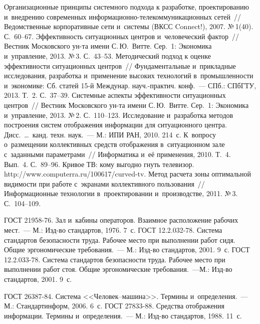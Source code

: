 \begin{multicols}{2}
{{\begin{thebibliography}{99}
 Организационные принципы сис\-тем\-но\-го подхода к разработке,
проектированию и~внедрению современных
ин\-фор\-ма\-ци\-он\-но-те\-ле\-ком\-му\-ни\-ка\-ци\-он\-ных сетей~// Ведомственные
корпоративные сети и~системы (ВКСС Connect!), 2007. №\,1(40). С.~60--67.
 Эффективность ситуационных центров
и~человеческий фактор~// Вестник Московского ун-та имени С.\,Ю.~Витте. Сер.~1:
Экономика и~управление, 2013. №\,3. С.~43--53.
 Методиче\-ский подход к оценке
эффективности ситуационных центров~// Фундаментальные и~прикладные
исследования, разработка и~применение высоких технологий в~промышленности
и~экономике: Сб. статей 15-й Междунар. науч.-практич. конф.~--- СПб.: СПбГТУ,
2013. Т.~2. С.~37--39.
 Системные аспекты эффективности
ситуационных центров~// Вестник Московского ун-та имени С.\,Ю.~Витте. Сер.~1:
Экономика и~управление, 2013. №\,2. С.~110--123.
 Исследование и~разработка методов построения систем
отображения информации для ситуационного центра. Дисс.\ \ldots\ канд. техн. наук.~---
М.: ИПИ РАН, 2010. 214~с.
 К~вопросу о~размещении коллективных средств отображения
в~ситуационном зале с~заданными параметрами~// Информатика и~её применения, 2010.
Т.~4. Вып.~4. С.~89--96.
 Кривое ТВ: кому выгодно гнуть телевизор. {\sf
http://www.computerra.ru/100617/curved-tv}.
 Метод расчета зоны
оптимальной видимости при работе с~экранами коллективного пользования~//
Информационные технологии в~проектировании и~производстве, 2011. №\,3.
С.~104--109.

ГОСТ 21958-76. Зал и~кабины операторов. Взаимное расположение рабочих мест.~--- М.:
Изд-во стандартов, 1976. 7~с.
ГОСТ 12.2.032-78. Система стандартов безопасности труда. Рабочее место при
выполнении работ сидя. Общие эргономические требования.~--- М.: Изд-во стандартов,
2001. 9~с.
ГОСТ 12.2.033-78. Система стандартов безопасности труда. Рабочее место при
выполнении работ стоя. Общие эргономические требования.~---М.: Изд-во стандартов,
2001. 9~с.

ГОСТ 26387-84. Система <<Че\-ло\-век--ма\-ши\-на>>. Термины и~определения.~--- М.:
Стандартинформ, 2006. 6~с.
ГОСТ 27833-88. Средства отображения информации. Термины и~определения.~--- М.:
Изд-во стандартов, 1988. 11~с.


\end{thebibliography}}}
\end{multicols}
